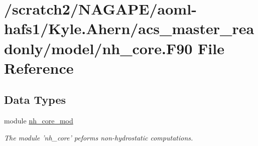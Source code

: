 \section{/scratch2/\-N\-A\-G\-A\-P\-E/aoml-\/hafs1/\-Kyle.Ahern/acs\-\_\-master\-\_\-readonly/model/nh\-\_\-core.F90 File Reference}
\label{nh__core_8F90}
\subsection*{Data Types}
\begin{DoxyCompactItemize}
\item 
module \hyperlink{classnh__core__mod}{nh\-\_\-core\-\_\-mod}
\begin{DoxyCompactList}\small\item\em The module 'nh\-\_\-core' peforms non-\/hydrostatic computations. \end{DoxyCompactList}\end{DoxyCompactItemize}
